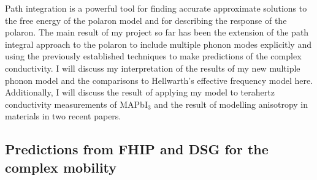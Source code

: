 
Path integration is a powerful tool for finding accurate approximate solutions to the free energy of the polaron model and for describing the response of the polaron. The main result of my project so far has been the extension of the path integral approach to the polaron to include multiple phonon modes explicitly and using the previously established techniques to make predictions of the complex conductivity. I will discuss my interpretation of the results of my new multiple phonon model and the comparisons to Hellwarth's effective frequency model here. Additionally, I will discuss the result of applying my model to terahertz conductivity measurements of MAPbI$_3$ and the result of modelling anisotropy in materials in two recent papers. 

\subsection{Predictions from FHIP and DSG for the complex mobility}

